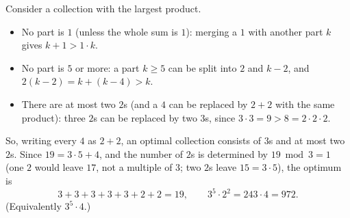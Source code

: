 Consider a collection with the largest product.
\begin{itemize}
\item No part is $1$ (unless the whole sum is $1$): merging a $1$ with another part $k$ gives $k+1>1\cdot k$.
\item No part is $5$ or more: a part $k\ge5$ can be split into $2$ and $k-2$, and $2(k-2)=k+(k-4)>k$.
\item There are at most two $2$s (and a $4$ can be replaced by $2+2$ with the same product): three $2$s can be replaced by two $3$s, since $3\cdot3=9>8=2\cdot2\cdot2$.
\end{itemize}
So, writing every $4$ as $2+2$, an optimal collection consists of $3$s and at most two $2$s. Since $19=3\cdot5+4$, and the number of $2$s is determined by $19\bmod3=1$ (one $2$ would leave $17$, not a multiple of $3$; two $2$s leave $15=3\cdot5$), the optimum is
\[
3+3+3+3+3+2+2=19,\qquad 3^5\cdot2^2=243\cdot4=\boxed{972}.
\]
(Equivalently $3^5\cdot4$.)
